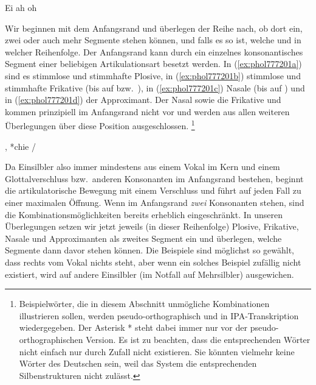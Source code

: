 \begin{exe}
	\ex\label{ex:phol777200}
	\begin{xlist}
		\ex Ei \textipa{[P\t{aE}]}	
		\ex ah \textipa{[Pa:]}	
		\ex oh \textipa{[Po:]}	
	\end{xlist}
\end{exe}

Wir beginnen mit dem Anfangsrand und überlegen der Reihe nach, ob dort ein, zwei oder auch mehr Segmente stehen können, und falls es so ist, welche und in welcher Reihenfolge.
Der Anfangsrand kann durch ein einzelnes konsonantisches Segment einer beliebigen Artikulationsart besetzt werden.
In (\ref{ex:phol777201a}) sind es stimmlose und stimmhafte Plosive, in (\ref{ex:phol777201b}) stimmlose und stimmhafte Frikative (bis auf \textipa{[X]} bzw.\ \textipa{[\c{c}]}), in (\ref{ex:phol777201c}) Nasale (bis auf \textipa{[N]}) und in (\ref{ex:phol777201d}) der Approximant.
Der Nasal \textipa{[N]} sowie die Frikative \textipa{[\c{c}]} und \textipa{[X]} kommen prinzipiell im Anfangsrand nicht vor und werden aus allen weiteren Überlegungen über diese Position ausgeschlossen.%
\footnote{Beispielwörter, die in diesem Abschnitt unmögliche Kombinationen illustrieren sollen, werden pseudo-orthographisch und in IPA-Transkription wiedergegeben.
Der Asterisk * steht dabei immer nur vor der pseudo-orthographischen Version.
Es ist zu beachten, dass die entsprechenden Wörter nicht einfach nur durch Zufall nicht existieren.
Sie könnten vielmehr keine Wörter des Deutschen sein, weil das System die entsprechenden Silbenstrukturen nicht zulässt.}

\begin{exe}
	\ex\label{ex:phol777201}
	\begin{xlist}
		\ex{\label{ex:phol777201a} Kuh \textipa{[ku:]}, geh \textipa{[ge:]}}
		, *chie \textipa{[\c{c}i:]}\slash\textipa{[Xi:]}
		\ex{\label{ex:phol777201c} nie \textipa{[ni:]}, mäh \textipa{[mE:]}, *ngu \textipa{[Nu:]}}
		\ex{\label{ex:phol777201d} lau \textipa{[l\t{aO}]}}
	\end{xlist}
\end{exe}

Da Einsilbler also immer mindestens aus einem Vokal im Kern und einem Glottalverschluss bzw.\ anderen Konsonanten im Anfangsrand bestehen, beginnt die artikulatorische Bewegung mit einem Verschluss und führt auf jeden Fall zu einer maximalen Öffnung. 
Wenn im Anfangsrand \textit{zwei} Konsonanten stehen, sind die Kombinationsmöglichkeiten bereits erheblich eingeschränkt.
In unseren Überlegungen setzen wir jetzt jeweils (in dieser Reihenfolge) Plosive, Frikative, Nasale und Approximanten als zweites Segment ein und überlegen, welche Segmente dann davor stehen können.
Die Beispiele sind möglichst so gewählt, dass rechts vom Vokal nichts steht, aber wenn ein solches Beispiel zufällig nicht existiert, wird auf andere Einsilbler (im Notfall auf Mehrsilbler) ausgewichen.

